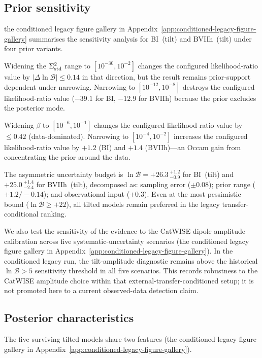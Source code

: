 \subsection{Prior sensitivity}\label{sec:prior-sensitivity}

the conditioned legacy figure gallery in Appendix~\ref{app:conditioned-legacy-figure-gallery} summarises the sensitivity
analysis for BI~(tilt) and BVIIh~(tilt) under four prior
variants.

Widening the $\Sigma^2_{\mathrm{std}}$ range to $[10^{-30}, 10^{-2}]$ changes
the configured likelihood-ratio value by $|\Delta\ln\mathcal{B}| \leq 0.14$ in that
direction, but the result remains prior-support dependent under
narrowing.  Narrowing to $[10^{-12}, 10^{-8}]$ destroys
the configured likelihood-ratio value ($-39.1$ for BI, $-12.9$ for BVIIh) because the
prior excludes the posterior mode.

Widening $\beta$ to $[10^{-6}, 10^{-1}]$ changes the configured likelihood-ratio value
by $\leq 0.42$ (data-dominated).  Narrowing to
$[10^{-4}, 10^{-2}]$ increases the configured likelihood-ratio value by $+1.2$ (BI)
and $+1.4$ (BVIIh)---an Occam gain from concentrating the
prior around the data.

The asymmetric uncertainty budget is
$\ln\mathcal{B} = +26.3\,{}^{+1.2}_{-0.9}$ for BI~(tilt) and
$+25.0\,{}^{+1.4}_{-2.4}$ for BVIIh~(tilt), decomposed as:
sampling error ($\pm 0.08$); prior range ($+1.2/-0.14$); and
observational input ($\pm 0.3$).  Even at the most pessimistic
bound ($\ln\mathcal{B} \geq +22$), all tilted models remain
preferred in the legacy transfer-conditional ranking.

We also test the sensitivity of the evidence to the CatWISE dipole
amplitude calibration across five systematic-uncertainty scenarios
(the conditioned legacy figure gallery in Appendix~\ref{app:conditioned-legacy-figure-gallery}).  In the conditioned legacy
run, the tilt-amplitude diagnostic remains above the historical
$\ln\mathcal{B}>5$ sensitivity threshold in all five scenarios.  This
records robustness to the CatWISE amplitude choice within that
external-transfer-conditioned setup; it is not promoted here to a
current observed-data detection claim.


\subsection{Posterior characteristics}
\label{sec:posteriors}

The five surviving tilted models share two features
(the conditioned legacy figure gallery in Appendix~\ref{app:conditioned-legacy-figure-gallery}).

